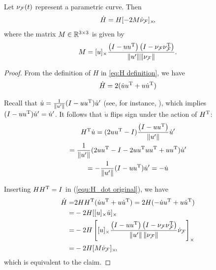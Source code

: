 \documentclass[10pt,twocolumn,twoside]{IEEEtran}
\begin{document}
{\begin{proposition}
  Let $\nu_{\mathcal{F}}(t)$ represent a parametric curve. Then
  \begin{equation}
    \dot{H}=H[-2M\dot{\nu}_{\mathcal{F}}]_{\times}\!,
  \end{equation}
  where the matrix $M\in\mathbb{R}^{3\times3}{}$ is given by
  \begin{equation}
    M=[u]_{\times}  \frac{ \left( I - u u^\mathrm{T} \right) \left( I- \nu_{\mathcal{F}} \nu_{\mathcal{F}}^\mathrm{T} \right)} {\lVert u'\rVert \lVert\nu_{\mathcal{F}}\rVert}.
  \end{equation}
\end{proposition}
\begin{proof}
    From the definition of $H$ in \eqref{eq:H definition}, we have
    \begin{equation} \label{equ:H_dot original}
      \dot H =   2(\dot u u^\mathrm{T} + u \dot u^\mathrm{T})
    \end{equation}

    Recall that $\dot{u}=\frac{1}{\lVert u'\rVert}(I-uu^\mathrm{T})\dot{u}'$ (see, for instance, \cite{Tron:Arxiv14}), which implies $(I-uu^\mathrm{T})\dot{u}'=\dot{u}'$. It follows that $\dot{u}$ flips sign under the action of $H^\mathrm{T}$:
    \begin{multline}
      H^\mathrm{T} \dot u = (2u u^\mathrm{T}-I)\frac{ \left( I - u u^\mathrm{T} \right) } {\left\|u'\right\|} \dot u' \\
      =\frac{1}{\lVert u'\rVert} (2u u^\mathrm{T}-I-2u u^\mathrm{T} u u^\mathrm{T}+u u^\mathrm{T})\dot{u}'\\
      = -\frac{1}{\lVert u'\rVert} (I-u u^\mathrm{T})\dot u'
      = -\dot u
    \end{multline}

    Inserting $HH^\mathrm{T}=I$ in (\ref{equ:H_dot original}), we have
    \begin{equation}
      \begin{split}
        \dot H =  &  2H H^\mathrm{T}(\dot u u^\mathrm{T} + u \dot u^\mathrm{T})
        =  2 H (-\dot u u^\mathrm{T} + u \dot u^\mathrm{T})\\
        =  &  -2H [[u]_{\times} \dot u]_{\times} \\
        = &  -2 H \left[ [u]_{\times}  \frac{ \left( I - u u^\mathrm{T} \right) \left( I- \nu_{\mathcal{F}} \nu_{\mathcal{F}}^\mathrm{T} \right)} {\left\|u'\right\| \left\|\nu_{\mathcal{F}}\right\|} \dot{\nu}_{\mathcal{F}}\right]_{\times}\\
        = & -2 H [M \dot{\nu}_{\mathcal{F}}]_{\times}\!,
      \end{split}
    \end{equation}
    which is equivalent to the claim.
  \end{proof}
}
\end{document}
